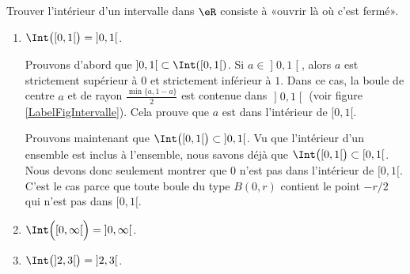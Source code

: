 \begin{example}
	Trouver l'intérieur d'un intervalle dans $\eR$ consiste à «ouvrir là où c'est fermé». 
	\begin{enumerate}

		\item
			$\Int\big(\mathopen[ 0 , 1 [\big)=\mathopen] 0 , 1 \mathclose[$. 
			
			Prouvons d'abord que $\mathopen] 0,1  \mathclose[\subset\Int(\mathopen[ 0 , 1 [)$. Si $a\in\mathopen] 0 , 1 \mathclose[$, alors $a$ est strictement supérieur à $0$ et strictement inférieur à $1$. Dans ce cas, la boule de centre $a$ et de rayon $\frac{ \min\{ a,1-a \} }{ 2 }$ est contenue dans $\mathopen] 0 , 1 \mathclose[$ (voir figure \ref{LabelFigIntervalle}). Cela prouve que $a$ est dans l'intérieur de $\mathopen[ 0 , 1 [$.

\newcommand{\CaptionFigIntervalle}{Trouver le rayon d'une boule autour de $a$. Une boule qui serait centrée en $a$ avec un rayon strictement plus petit à la fois de $a$ et de $1-a$ est entièrement contenue dans le segment $\mathopen] 0 , 1 \mathclose[$.}


			Prouvons maintenant que $\Int\big( \mathopen[ 0 , 1 [ \big)\subset\mathopen] 0 , 1 \mathclose[$. Vu que l'intérieur d'un ensemble est inclus à l'ensemble, nous savons déjà que $\Int\big( \mathopen[ 0 , 1 [ \big)\subset\mathopen[ 0 , 1 [$. Nous devons donc seulement montrer que $0$ n'est pas dans l'intérieur de $\mathopen[ 0 , 1 [$. C'est le cas parce que toute boule du type $B(0,r)$ contient le point $-r/2$ qui n'est pas dans $\mathopen[ 0 , 1 [$.

		\item
			$\Int\Big( \mathopen[ 0 , \infty [ \Big)=\mathopen] 0 , \infty \mathclose[$.
		\item
			$\Int\big( \mathopen] 2 , 3 \mathclose[ \big)=\mathopen] 2 , 3 \mathclose[$.

	\end{enumerate}
	
\end{example}

